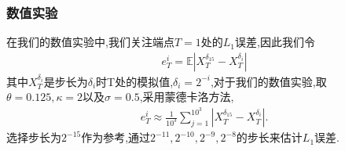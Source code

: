 \documentclass[12pt,final]{article}
\theoremstyle{plain}
\theoremstyle{Definition}
\theoremstyle{Remark}
\begin{document}
	\subsubsection{数值实验}
	在我们的数值实验中,我们关注端点$T = 1$处的$L_1$误差,因此我们令
	\begin{align*}
		e_T^{i}=\mathbb{E}\left|X_T^{\delta _{15}}-X_T^{\delta _i}\right|
	\end{align*}
	其中$X_T^{\delta _i}$是步长为$\delta _i$时T处的模拟值,$\delta _i = 2^{-i}$,对于我们的数值实验,取$\theta=0.125,\kappa=2$以及$\sigma=0.5$,采用蒙德卡洛方法,
	\begin{align*}
		e_{T}^i\approx\frac{1}{10^3}\sum_{j=1}^{10^3}\left|X_T^{\delta _{15}}-X_T^{\delta _i}\right|.
	\end{align*}
	选择步长为$2^{-15}$作为参考,通过${2^{-11},2^{-10},2^{-9},2^{-8}}$的步长来估计$L_1$误差.
\end{document}
